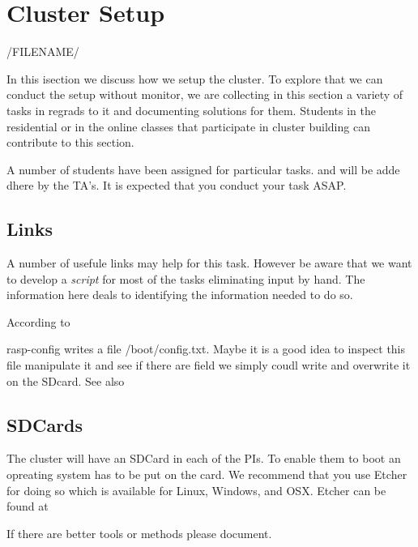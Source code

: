 \chapter{Cluster Setup}

/FILENAME/

In this isection we discuss how we setup the cluster. To explore that
we can conduct the setup without monitor, we are collecting in this
section a variety of tasks in regrads to it and documenting solutions
for them. Students in the residential or in the online classes that
participate in cluster building can contribute to this section.

A number of students have been assigned for particular tasks. and will
be adde dhere by the TA's. It is expected that you conduct your task ASAP.

\section{Links}

A number of usefule links may help for this task. However be aware
that we want to develop a \textit{script} for most of the tasks
eliminating input by hand. The information here deals to identifying
the information needed to do so.



According to 


rasp-config writes a file /boot/config.txt. Maybe it is a good idea to
inspect this file manipulate it and see if there are field we simply
coudl write and overwrite it on the SDcard. See also 



\section{SDCards}

The cluster will have an SDCard in each of the PIs. To enable them to
boot an opreating system has to be put on the card. We recommend that
you use Etcher for doing so which is available for Linux, Windows, and
OSX. Etcher can be found at 

If there are better tools or methods please document.


